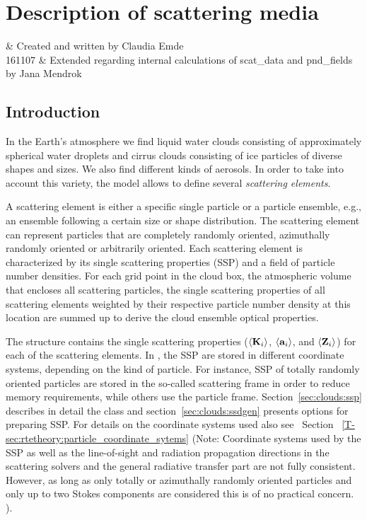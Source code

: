 \graphicspath{{Figs/clouds/}}

\chapter{Description of scattering media}
 \label{sec:clouds}

 & Created and written by Claudia Emde\\ 
 161107 & Extended regarding internal calculations of scat\_data and pnd\_fields by Jana Mendrok\\ 
\stophistory

\section{Introduction}
\label{sec:clouds:intro}

In the Earth's atmosphere we find liquid water clouds consisting of
approximately spherical water droplets and cirrus clouds consisting of
ice particles of diverse shapes and sizes. We also find different
kinds of aerosols. In order to take into account this variety, the
model allows to define several \emph{scattering elements}.

A scattering element is either a specific single particle or a particle
ensemble, e.g., an ensemble following a certain size or shape distribution. The
scattering element can represent particles that are completely randomly
oriented, azimuthally randomly oriented or arbitrarily oriented. Each scattering
element is characterized by its single scattering properties (SSP) and a field of
particle number densities.
For each grid point in the cloud box, the atmospheric volume that encloses all
scattering particles, the single scattering properties of all scattering
elements weighted by their respective particle number density at this location
are summed up to derive the cloud ensemble optical properties.

The  structure contains the single scattering properties
($\langle{\bf K}_i\rangle$, $\langle{\bf a}_i\rangle$, and
$\langle{\bf Z}_i\rangle$) for each of the scattering elements. 
In , the SSP are stored in different coordinate systems,
depending on the kind of particle. For instance, SSP of totally randomly
oriented particles are stored in the so-called scattering frame in order to
reduce memory requirements, while others use the particle frame.
Section~\ref{sec:clouds:ssp} describes in detail the
 class and section~\ref{sec:clouds:ssdgen}
presents options for preparing SSP.
For details on the coordinate systems used also see \theory~Section~%
\ref{T-sec:rtetheory:particle_coordinate_sytems} (Note: Coordinate systems used
by the SSP as well as the line-of-sight and radiation propagation directions in
the scattering solvers and the general radiative transfer part are not fully
consistent. However, as long as only totally or azimuthally randomly oriented
particles and only up to two Stokes components are considered this is of no
practical concern.
).

